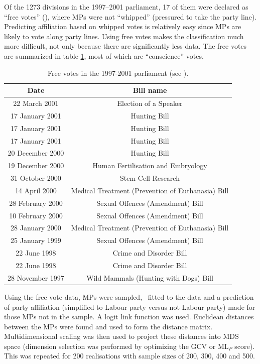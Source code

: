 Of the 1273 divisions in the 1997--2001 parliament, 17 of them were declared  as ``free votes'' (\cite{freevotes}), where MPs were not ``whipped'' (pressured to take the party line). Predicting affiliation based on whipped votes is relatively easy since MPs are likely to vote along party lines. Using free votes makes the classification much more difficult, not only because there are\label{cor-r1-4} significantly less data. The free votes are summarized in table \ref{free-vote-description}, most of which are ``conscience'' votes.

\begin{table}  
\begin{centering}
\begin{tabular}{cc}
	Date & Bill name \\
    \hline
22 March 2001    &   Election of a Speaker \\
17 January 2001  &   Hunting Bill \\
17 January 2001  &   Hunting Bill \\
17 January 2001  &   Hunting Bill\\
20 December 2000 &   Hunting Bill \\
19 December 2000 &   Human Fertilisation and Embryology\\
31 October 2000  &   Stem Cell Research \\
14 April 2000    &   Medical Treatment (Prevention of Euthanasia) Bill \\
28 February 2000 &   Sexual Offences (Amendment) Bill \\
10 February 2000 &   Sexual Offences (Amendment) Bill \\
28 January 2000  &   Medical Treatment (Prevention of Euthanasia) Bill\\
25 January 1999  &   Sexual Offences (Amendment) Bill\\
22 June 1998     &  Crime and Disorder Bill \\
22 June 1998     &  Crime and Disorder Bill \\
28 November 1997 &  Wild Mammals (Hunting with Dogs) Bill\\
  \end{tabular}
\caption{Free votes in the 1997-2001 parliament (see \cite{freevotes}).}
\label{free-vote-description}
\end{centering}
\end{table}

Using the free vote data, MPs were sampled, \mdsds\ fitted to the data and a prediction of party affiliation (simplified to Labour party versus not Labour party) made for those MPs not in the sample. A \label{cor-5s10}logit link function was used. Euclidean distances between the MPs were found and used to form the distance matrix. Multidimensional scaling was then used to project these distances into MDS space (dimension selection was performed by optimizing the GCV or $\text{ML}_P$ score). This was repeated for 200 realisations with sample sizes of 200, 300, 400 and 500.

